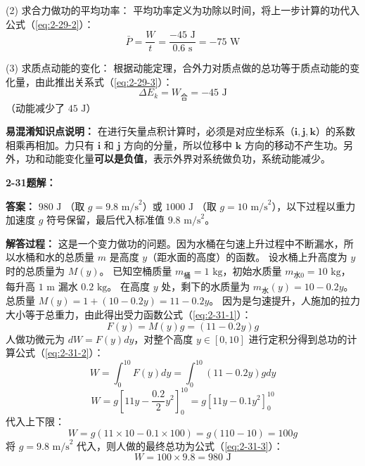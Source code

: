 (2) 求合力做功的平均功率：
平均功率定义为功除以时间，将上一步计算的功代入公式（\ref{eq:2-29-2}）：
\begin{equation}\label{eq:2-29-2}
	\bar{P} = \frac{W}{t} = \frac{-45\text{ J}}{0.6\text{ s}} = -75\text{ W}
\end{equation}

(3) 求质点动能的变化：
根据动能定理，合外力对质点做的总功等于质点动能的变化量，由此推出关系式（\ref{eq:2-29-3}）：
\begin{equation}\label{eq:2-29-3}
	\Delta E_k = W_{\text{合}} = -45\text{ J}
\end{equation}
（动能减少了 $45\text{ J}$）

\textbf{易混淆知识点说明：}
在进行矢量点积计算时，必须是对应坐标系（$\mathbf{i}, \mathbf{j}, \mathbf{k}$）的系数相乘再相加。力只有 $\mathbf{i}$ 和 $\mathbf{j}$ 方向的分量，所以位移中 $\mathbf{k}$ 方向的移动不产生功。另外，功和动能变化量\textbf{可以是负值}，表示外界对系统做负功，系统动能减少。

\vspace{2em}

\textbf{2-31题解：}
\setcounter{equation}{0}
\renewcommand{\theHequation}{2-31.\arabic{equation}}

\textbf{答案：} $980\text{ J}$ （取 $g=9.8\text{ m/s}^2$）或 $1000\text{ J}$ （取 $g=10\text{ m/s}^2$），以下过程以重力加速度 $g$ 符号保留，最后代入标准值 $9.8\text{ m/s}^2$。

\textbf{解答过程：}
这是一个变力做功的问题。因为水桶在匀速上升过程中不断漏水，所以水桶和水的总质量 $m$ 是高度 $y$（距水面的高度）的函数。
设水桶上升高度为 $y$ 时的总质量为 $M(y)。$
已知空桶质量 $m_{\text{桶}} = 1\text{ kg}$，初始水质量 $m_{\text{水0}} = 10\text{ kg}$，每升高 $1\text{ m}$ 漏水 $0.2\text{ kg}$。
在高度 $y$ 处，剩下的水质量为 $m_{\text{水}}(y) = 10 - 0.2y$。
总质量 $M(y) = 1 + (10 - 0.2y) = 11 - 0.2y$。
因为是匀速提升，人施加的拉力大小等于总重力，由此得出受力函数公式（\ref{eq:2-31-1}）：
\begin{equation}\label{eq:2-31-1}
	F(y) = M(y)g = (11 - 0.2y)g
\end{equation}
人做功微元为 $dW = F(y) dy$，对整个高度 $y \in [0, 10]$ 进行定积分得到总功的计算公式（\ref{eq:2-31-2}）：
\begin{equation}\label{eq:2-31-2}
	W = \int_{0}^{10} F(y) dy = \int_{0}^{10} (11 - 0.2y)g dy
\end{equation}
$$W = g \left[ 11y - \frac{0.2}{2}y^2 \right]_{0}^{10} = g \left[ 11y - 0.1y^2 \right]_{0}^{10}$$
代入上下限：
$$W = g (11 \times 10 - 0.1 \times 100) = g(110 - 10) = 100g$$
将 $g = 9.8\text{ m/s}^2$ 代入，则人做的最终总功为公式（\ref{eq:2-31-3}）：
\begin{equation}\label{eq:2-31-3}
	W = 100 \times 9.8 = 980\text{ J}
\end{equation}

